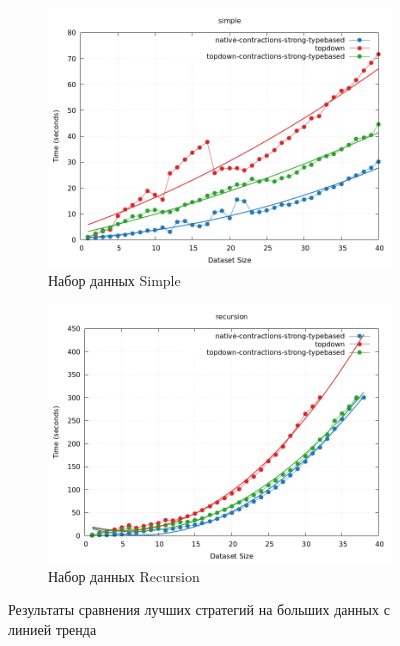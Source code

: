 \documentclass[../thesis.tex]{subfiles}
\begin{document}
\begin{figure}[h]
    \begin{subfigure}{0.5\textwidth}
    \includegraphics[width=\linewidth]{winners_simple.png} 
    \caption{Набор данных Simple}
    \label{plot_winners_simple}
    \end{subfigure}
    \begin{subfigure}{0.5\textwidth}
    \includegraphics[width=\linewidth]{winners_recursion.png}
    \caption{Набор данных Recursion}
    \label{plot_winners_recursion}
    \end{subfigure}
    \caption{Результаты сравнения лучших стратегий на больших данных с линией тренда}
    \label{plot_winners}
\end{figure}
\end{document}
